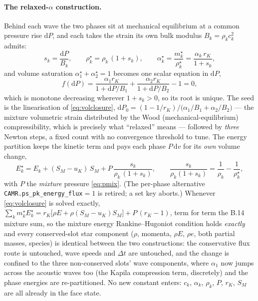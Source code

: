 \documentclass[11pt,a4paper]{article}
\newcommand{\code}[1]{\texttt{\small #1}}
\begin{document}
\paragraph{The relaxed-$\alpha$ construction.}
Behind each wave the two phases sit at mechanical equilibrium at a common
pressure rise $\mathrm{d}P$, and each takes the strain its own bulk modulus
$B_k=\rho_kc_k^2$ admits:
\begin{equation}
  s_k = \frac{\mathrm{d}P}{B_k},
  \qquad
  \rho_k^\star = \rho_k\,(1+s_k),
  \qquad
  \alpha_k^\star = \frac{m_k^\star}{\rho_k^\star}
                 = \frac{\alpha_k\,r_K}{1+s_k},
  \label{eq:strain}
\end{equation}
and volume saturation $\alpha_1^\star+\alpha_2^\star=1$ becomes one scalar
equation in $\mathrm{d}P$,
\begin{equation}
  f(\mathrm{d}P)
  = \frac{\alpha_1 r_K}{1+\mathrm{d}P/B_1}
  + \frac{\alpha_2 r_K}{1+\mathrm{d}P/B_2} - 1 = 0 ,
  \label{eq:volclosure}
\end{equation}
which is monotone decreasing wherever $1+s_k>0$, so its root is unique.  The
seed is the linearisation of \eqref{eq:volclosure},
$\mathrm{d}P_0=(1-1/r_K)\big/\bigl(\alpha_1/B_1+\alpha_2/B_2\bigr)$ --- the
mixture volumetric strain distributed by the Wood (mechanical-equilibrium)
compressibility, which is precisely what ``relaxed'' means --- followed by
\emph{three} Newton steps, a fixed count with no convergence threshold to
tune.  The energy partition keeps the kinetic term and pays each phase
$P\,\mathrm{d}v$ for its \emph{own} volume change,
\begin{equation}
  E_k^\star = E_k + (S_M-u_K)\,S_M
            + P\,\frac{s_k}{\rho_k\,(1+s_k)},
  \qquad
  \frac{s_k}{\rho_k(1+s_k)} = \frac{1}{\rho_k}-\frac{1}{\rho_k^\star},
  \label{eq:estar}
\end{equation}
with $P$ the \emph{mixture} pressure \eqref{eq:pmix}.  (The per-phase
alternative \code{CAMR.ps\_pk\_energy\_flux}$=1$ is retired; a set key
aborts.)  Whenever \eqref{eq:volclosure} is solved exactly,
$\sum_k m_k^\star E_k^\star = r_K\bigl[\rho E+\rho(S_M-u_K)S_M\bigr]+P\,(r_K-1)$,
term for term the B.14 mixture sum, so the mixture energy Rankine--Hugoniot
condition holds \emph{exactly} and every conserved-slot star component
($\rho$, momenta, $\rho E$, $\rho e$, both partial masses, species) is
identical between the two constructions: the conservative flux route is
untouched, wave speeds and $\Delta t$ are untouched, and the change is
confined to the three non-conserved slots' wave components, where $\alpha_1$
now jumps across the acoustic waves too (the Kapila compression term,
discretely) and the phase energies are re-partitioned.  No new constant enters:
$c_k$, $\alpha_k$, $\rho_k$, $P$, $r_K$, $S_M$ are all already in the face
state.
\end{document}
